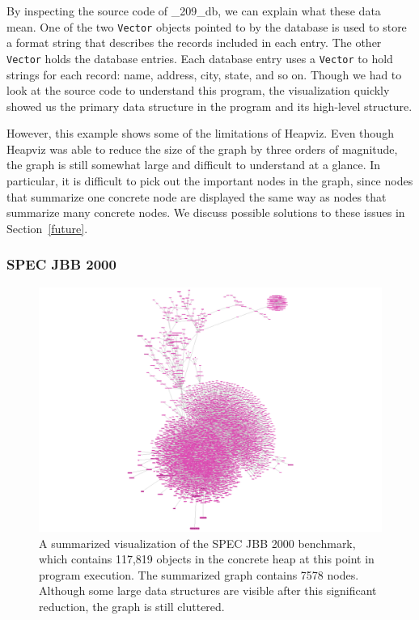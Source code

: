 By inspecting the source code of \_209\_db, we can explain what these data mean.
One of the two \texttt{Vector} objects pointed to by the database is used
to store a format string that describes the records included in each entry.
The other \texttt{Vector} holds the database entries.  Each database entry
uses a \texttt{Vector} to hold strings for each record: name, address, city,
state, and so on.  Though we had to look at the source code to understand 
this program, the visualization quickly showed us the primary data structure 
in the program and its high-level structure.

However, this example shows some of the limitations of Heapviz.  
Even though Heapviz was able to reduce the size of the graph by three orders
of magnitude, the graph is still somewhat large and difficult to understand 
at a glance.  In particular, it is difficult to pick out the important nodes in 
the graph, since nodes that summarize one concrete node are displayed the same
way as nodes that summarize many concrete nodes.  We discuss possible 
solutions to these issues in Section~\ref{future}.


\subsubsection{SPEC JBB 2000}
\label{jbb}

\begin{figure}[t]
  \includegraphics[width=\columnwidth]{figs/jbb}
  \caption{A summarized visualization of the SPEC JBB 2000 benchmark, which 
contains 117,819 objects in the concrete heap at this point in program execution. 
The summarized graph contains 7578 nodes.  Although some large data structures 
are visible after this significant reduction, the graph is still cluttered.}
  \label{fig:jbb}
\end{figure}

